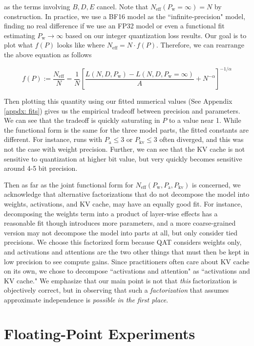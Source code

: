 \documentclass[11pt]{article}
\begin{document}
as the terms involving $B, D, E$ cancel. Note that $N_\text{eff}(P_\text{w}=\infty) = N$ by construction. In practice, we use a BF16 model as the ``infinite-precision" model, finding no real difference if we use an FP32 model or even a functional fit estimating $P_\text{w} \to \infty$ based on our integer quantization loss results. Our goal is to plot what $f(P)$ looks like where $N_\text{eff} = N \cdot f(P)$. Therefore, we can rearrange the above equation as follows 

\begin{equation}
    f(P) := \frac{N_\text{eff}}{N} = \frac{1}{N}\left[\frac{L(N, D, P_\text{w})-L(N,D,P_\text{w}=\infty)}{A}+N^{-\alpha}\right]^{-1/\alpha}
\end{equation}

Then plotting this quantity using our fitted numerical values (See Appendix \ref{appdx: fits}) gives us the empirical tradeoff between precision and parameters. We can see that the tradeoff is quickly saturating in $P$ to a value near 1. While the functional form is the same for the three model parts, the fitted constants are different. For instance, runs with $P_\text{a} \le 3$ or $P_\text{kv} \le 3$ often diverged, and this was not the case with weight precision. Further, we can see that the KV cache is not sensitive to quantization at higher bit value, but very quickly becomes sensitive around 4-5 bit precision. 


Then as far as the joint functional form for $N_\text{eff}(P_\text{w}, P_\text{a}, P_\text{kv})$ is concerned, we acknowledge that alternative factorizations that do not decompose the model into weights, activations, and KV cache, may have an equally good fit. For instance, decomposing the weights term into a product of layer-wise effects has a reasonable fit though introduces more parameters, and a more coarse-grained version may not decompose the model into parts at all, but only consider tied precisions. We choose this factorized form because QAT considers weights only, and activations and attentions are the two other things that must then be kept in low precision to see compute gains. Since practitioners often care about KV cache on its own, we chose to decompose ``activations and attention" as ``activations and KV cache." We emphasize that our main point is not that \textit{this} factorization is objectively correct, but in observing that such a \textit{factorization} that assumes approximate independence is \textit{possible in the first place}. 


\section{Floating-Point Experiments}
\label{appdx:fp}
\end{document}
